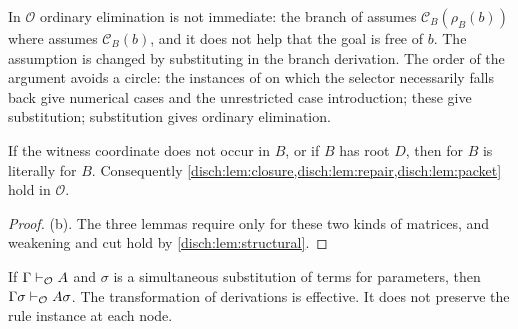 In $\mathcal O$ ordinary elimination is not immediate: the branch of
 assumes $\mathcal C_B(\rho_B(b))$ where 
assumes $\mathcal C_B(b)$, and it does not help that the goal is free of
$b$. The assumption is changed by substituting in the branch derivation.
The order of the argument avoids a circle: the instances of
 on which the selector necessarily falls back give
numerical cases and the unrestricted case introduction; these give
substitution; substitution gives ordinary elimination.

\begin{lemma}
\label{disch:lem:fallback}
If the witness coordinate does not occur in $B$, or if $B$ has root $D$,
then  for $B$ is literally  for $B$.
Consequently
\cref{disch:lem:closure,disch:lem:repair,disch:lem:packet} hold in
$\mathcal O$.
\end{lemma}

\begin{proof}
(b). The three lemmas require 
only for these two kinds of matrices, and weakening and cut hold by
\cref{disch:lem:structural}.
\end{proof}

\begin{theorem}
\label{disch:thm:subst}
If $\Gamma\vdash_{\mathcal O}A$ and $\sigma$ is a simultaneous
substitution of terms for parameters, then
$\Gamma\sigma\vdash_{\mathcal O}A\sigma$. The transformation of
derivations is effective. It does not preserve the rule instance at each
node.
\end{theorem}

